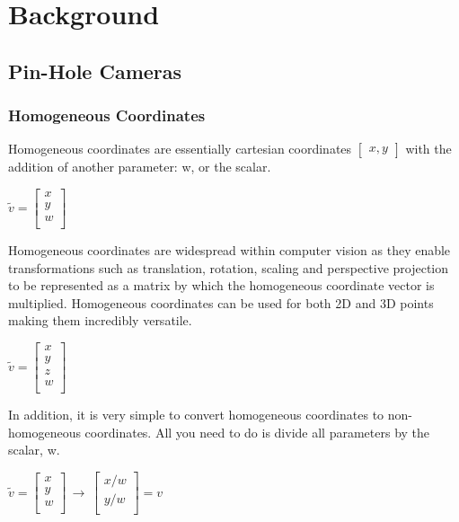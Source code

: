 \documentclass[11pt, twoside, reqno]{book}
\begin{document}
\chapter{Background}
\label{label}

\section{Pin-Hole Cameras}
\label{label}
\subsection{Homogeneous Coordinates}
 Homogeneous coordinates are essentially cartesian coordinates $ \begin{bmatrix}
 x, y
 \end{bmatrix}$ with the addition of another parameter: w, or the scalar. 

\begin{center}
	
	$\widetilde{v} =
	\begin{bmatrix}
	x\\
	y\\
	w\\
	\end{bmatrix}$
	
\end{center}
 
 Homogeneous coordinates are widespread within computer vision as they enable transformations such as translation, rotation, scaling and perspective projection to be represented as a matrix by which the homogeneous coordinate vector is multiplied. Homogeneous coordinates can be used for both 2D and 3D points making them incredibly versatile\cite{sze}. 
 
 \begin{center}
	$\widetilde{v} =
\begin{bmatrix}
x\\
y\\
z\\
w\\
\end{bmatrix}$

 \end{center}

 In addition, it is very simple to convert homogeneous coordinates to non-homogeneous coordinates. All you need to do is divide all parameters by the scalar, w\cite{sze}. 
 
\begin{center}
	
	$\widetilde{v} =
	\begin{bmatrix}
	x\\
	y\\
	w\\
	\end{bmatrix} \,\to\, \begin{bmatrix}
	x/w\\
	y/w\\

	\end{bmatrix} = v $
	
\end{center}
 
\end{document}
